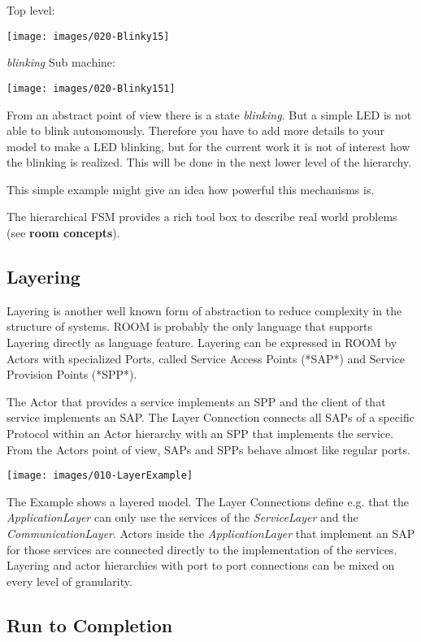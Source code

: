 Top level:

\texttt{[image: images/020-Blinky15]}

\textit{blinking} Sub machine:

\texttt{[image: images/020-Blinky151]}

From an abstract point of view there is a state \textit{blinking}. But a simple LED is not able to blink autonomously. Therefore you have to add more details to your model to make a LED blinking, but for the current work it is not of interest how the blinking is realized. This will be done in the next lower level of the hierarchy. 

This simple example might give an idea how powerful this mechanisms is.

The hierarchical FSM provides a rich tool box to describe real world problems (see \textbf{room concepts}).

\subsection{Layering}

Layering is another well known form of abstraction to reduce complexity in the structure of systems. ROOM is probably the only language that supports Layering directly as language feature.
Layering can be expressed in ROOM by Actors with specialized Ports, called Service Access Points (*SAP*) and Service Provision Points (*SPP*).

The Actor that provides a service implements an SPP and the client of that service implements an SAP. The Layer Connection connects all SAPs of a specific Protocol within an Actor hierarchy with an SPP that implements the service. From the Actors point of view, SAPs and SPPs behave almost like regular ports.

\texttt{[image: images/010-LayerExample]}

The Example shows a layered model. The Layer Connections define e.g. that the \textit{ApplicationLayer} can only use the services of the \textit{ServiceLayer} and the \textit{CommunicationLayer}. Actors inside the \textit{ApplicationLayer} that implement an SAP for those services are connected directly to the implementation of the services. 
Layering and actor hierarchies with port to port connections can be mixed on every level of granularity. 

\subsection{Run to Completion}

